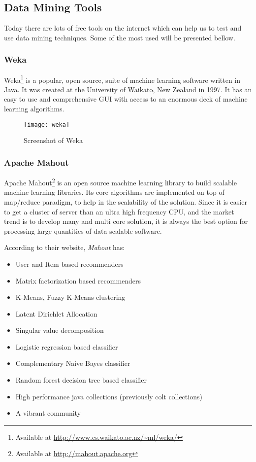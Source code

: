 \subsection{Data Mining Tools}
Today there are lots of free tools on the internet which can help us to test and use data mining techniques.
Some of the most used will be presented bellow.

\subsubsection{Weka}

Weka\footnote{ Available at \url{http://www.cs.waikato.ac.nz/~ml/weka/}} is a popular, open source, suite of machine learning software written in Java.
It was created at the University of Waikato, New Zealand in 1997. It has an easy to use and comprehensive GUI with access to an enormous deck of machine learning algorithms.

\begin{figure}[h]
  \begin{center}
    \leavevmode
    \texttt{[image: weka]}
    \caption{Screenshot of Weka \protect\footnotemark}
    \label{fig:RapidMiner}
  \end{center}
\end{figure}

\subsubsection{Apache Mahout}

Apache Mahout\footnote{ Available at \url{http://mahout.apache.org}} is an open source machine learning library to build scalable machine learning libraries.
Its core algorithms are implemented on top of map/reduce paradigm, to help in the scalability of the solution.
Since it is easier to get a cluster of server than an ultra high frequency CPU, and the market trend is to develop many and multi core solution, it is always the best option for processing large quantities of data scalable software.

According to their website, \emph{Mahout} has:
\begin{itemize}

\item User and Item based recommenders
\item Matrix factorization based recommenders
\item K-Means, Fuzzy K-Means clustering
\item Latent Dirichlet Allocation
\item Singular value decomposition
\item Logistic regression based classifier
\item Complementary Naive Bayes classifier
\item Random forest decision tree based classifier
\item High performance java collections (previously colt collections)
\item  A vibrant community

\end{itemize}

